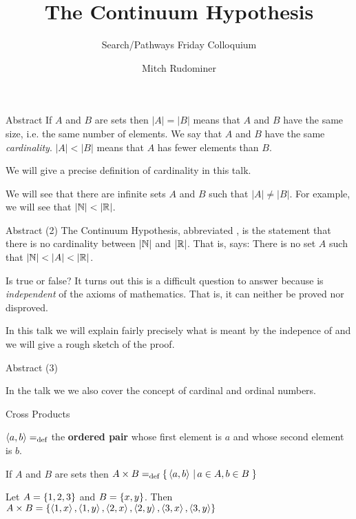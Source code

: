 \documentclass[pdf,final]{prosper}
\title{The Continuum Hypothesis}
\subtitle{Search/Pathways Friday Colloquium}
\author{Mitch Rudominer}
\newcommand{\skipmed}{\vspace{2em}}
\begin{document}
\maketitle

\begin{slide}{Abstract}
If $A$ and $B$ are sets then $|A|=|B|$ means that $A$ and $B$ have the same
size, i.e. the same number of elements. We say that $A$ and $B$ have the same \emph{cardinality}.
$|A|< |B|$ means that $A$ has fewer elements than $B$.

\skipmed
We will give a precise definition of cardinality in this talk.

\skipmed

We will see that there are infinite sets
$A$ and $B$ such that $|A| \neq |B|$. For example, we will see that $|\mathbb{N}| <
|\mathbb{R}|$.

\end{slide}
\begin{slide}{Abstract (2)}
The Continuum Hypothesis, abbreviated \CH, is the statement
that there is no cardinality between $|\mathbb{N}|$ and $|\mathbb{R}|$. That is, \CH says: There
is no set $A$ such that $|\mathbb{N}| < |A| < |\mathbb{R}|$.

\skipmed

Is \CH true or false? It turns out this is a difficult question to
answer because \CH is \emph{independent} of the axioms of mathematics.
That is, it can neither be proved nor disproved.

\skipmed

In this talk we will explain fairly precisely what is meant by the indepence of
\CH and we will give a rough sketch of the proof.

\end{slide}
\begin{slide}{Abstract (3)}

\skipmed

In the talk we we also cover the concept of cardinal and ordinal numbers.

\end{slide}

\begin{slide}{Cross Products}

\begin{definition}
$\left\langle a,b \right\rangle=_{\text{def}}$ the \textbf{ordered pair} whose first element is $a$ and
whose second element is $b$.
\end{definition}

\skipmed

\begin{definition}
If $A$ and $B$ are sets then 
$ A \times B =_{\text{def}}\left\{ \, \left\langle a,b \right\rangle \, \left| \, a\in A, b \in B \, \right.\right\}$
\end{definition}

\skipmed

\begin{example}
Let $A = \left\{1,2,3\right\}$ and $B = \left\{x,y\right\}$. Then
$A \times B = \left\{ \left\langle 1,x \right\rangle,\left\langle 1,y \right\rangle,\left\langle 2,x \right\rangle,\left\langle 2,y \right\rangle, \left\langle 3,x \right\rangle,\left\langle 3,y \right\rangle\right\}$
\end{example}

\end{slide}
\end{document}
